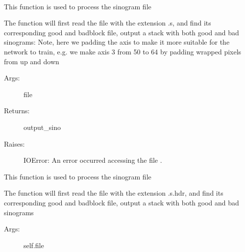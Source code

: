 \documentclass[letterpaper,10pt,english]{sphinxmanual}
\begin{document}
\begin{fulllineitems}
\label{\detokenize{usage/tof_file:sino_process_tof.Sinogram_Processor}}~

\begin{fulllineitems}
\label{\detokenize{usage/tof_file:sino_process_tof.Sinogram_Processor.process_data}}
This function is used to process the sinogram file

The function will first read the file with the extension .s,
and find its corresponding good and badblock file, output a stack
with both good and bad sinograms: Note, here we padding the axis
to make it more suitable for the network to train, e.g. we make axis
3 from 50 to 64 by padding wrapped pixels from up and down
\begin{description}
\item[{Args:}] \leavevmode
file

\item[{Returns:}] \leavevmode
output\_sino

\item[{Raises:}] \leavevmode
IOError: An error occurred accessing the file .

\end{description}

\end{fulllineitems}


\begin{fulllineitems}
\label{\detokenize{usage/tof_file:sino_process_tof.Sinogram_Processor.process_sino_file}}
This function is used to process the sinogram file

The function will first read the file with the extension .s.hdr,
and find its corresponding good and badblock file, output a stack
with both good and bad sinograms
\begin{description}
\item[{Args:}] \leavevmode
self.file


\end{description}
\end{fulllineitems}
\end{fulllineitems}
\end{document}
